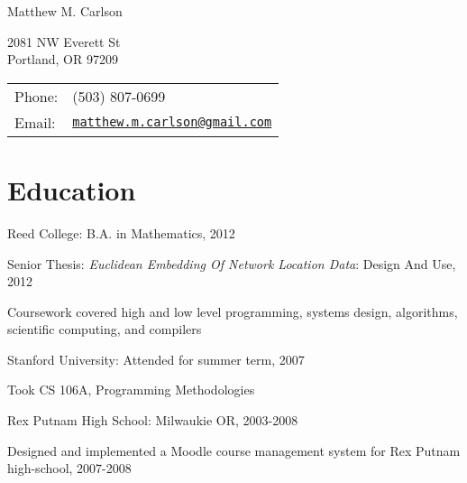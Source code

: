 \documentclass[letterpaper]{article}
\def\name{Matthew M. Carlson}%
\renewenvironment{itemize}{\begin{list}{}{\setlength{\leftmargin}{1.5em}}}{\end{list}}%
\begin{document}
{\huge \name}%
\vspace{0.25in}

\begin{minipage}{0.45\linewidth}
	2081 NW Everett St \\
	Portland, OR 97209
\end{minipage}
\begin{minipage}{0.45\linewidth}
	\begin{tabular}{ll}
	Phone: & (503) 807-0699 \\
	Email: & \href{mailto:matthew.m.carlson@gmail.com}{\tt matthew.m.carlson@gmail.com} \\
  \end{tabular}
\end{minipage}





\section*{Education}

\begin{itemize}
  \item Reed College: B.A. in Mathematics, 2012
	\begin{itemize}
        \item Senior Thesis: \textit{Euclidean Embedding Of Network Location Data}: Design And Use, 2012
        \item Coursework covered high and low level programming, systems design, algorithms, scientific computing, and compilers 
	\end{itemize}
  \item Stanford University: Attended for summer term, 2007
  \begin{itemize}
        \item Took CS 106A, Programming Methodologies
  \end{itemize}
  \item Rex Putnam High School: Milwaukie OR, 2003-2008
  \begin{itemize}
    \item Designed and implemented a Moodle course management system for Rex Putnam high-school, 2007-2008
  \end{itemize}
\end{itemize}
\end{document}
